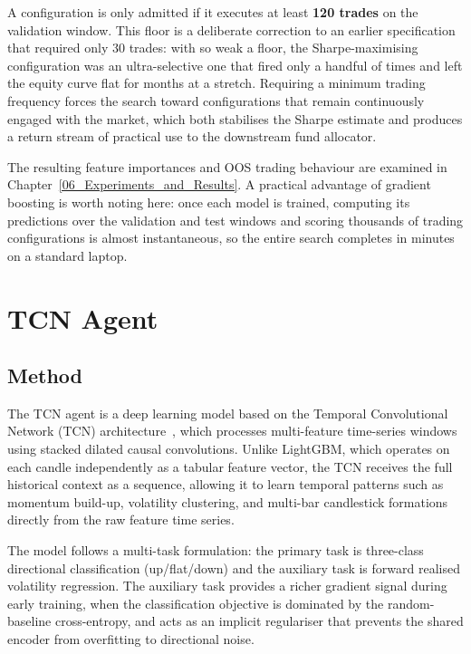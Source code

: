 A configuration is only admitted if it executes at least \textbf{120 trades} on the validation window. This floor is a deliberate correction to an earlier specification that required only 30 trades: with so weak a floor, the Sharpe-maximising configuration was an ultra-selective one that fired only a handful of times and left the equity curve flat for months at a stretch. Requiring a minimum trading frequency forces the search toward configurations that remain continuously engaged with the market, which both stabilises the Sharpe estimate and produces a return stream of practical use to the downstream fund allocator.


The resulting feature importances and OOS trading behaviour are examined in Chapter~\ref{06_Experiments_and_Results}. A practical advantage of gradient boosting is worth noting here: once each model is trained, computing its predictions over the validation and test windows and scoring thousands of trading configurations is almost instantaneous, so the entire search completes in minutes on a standard laptop.



\section{TCN Agent}
\label{sec:tcn_agent}

\subsection{Method}

The TCN agent is a deep learning model based on the Temporal Convolutional Network (TCN) architecture~\cite{bai2018empirical}, which processes multi-feature time-series windows using stacked dilated causal convolutions. Unlike LightGBM, which operates on each candle independently as a tabular feature vector, the TCN receives the full historical context as a sequence, allowing it to learn temporal patterns such as momentum build-up, volatility clustering, and multi-bar candlestick formations directly from the raw feature time series.


The model follows a multi-task formulation: the primary task is three-class directional classification (up/flat/down) and the auxiliary task is forward realised volatility regression. The auxiliary task provides a richer gradient signal during early training, when the classification objective is dominated by the random-baseline cross-entropy, and acts as an implicit regulariser that prevents the shared encoder from overfitting to directional noise.

